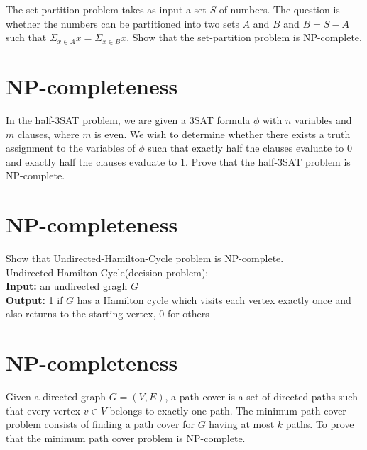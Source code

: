 \documentclass[a4paper,11pt]{article}
\begin{document}
The {\sc set-partition} problem takes as input a set $S$ of numbers. The question is whether the numbers can be partitioned into two sets $A$ and $B$ and $B = S-A$ such that $\Sigma_{x\in A} x=\Sigma_{x\in B} x$. Show that the set-partition problem is NP-complete.

\section{NP-completeness}

In the {\sc half-3SAT} problem, we are given a 3SAT formula $\phi$ with $n$ variables and $m$ clauses, where $m$ is even. We wish to determine whether there exists a truth assignment to the variables of $\phi$ such that exactly half the clauses evaluate to $0$ and exactly half the clauses evaluate to $1$. Prove that the {\sc half-3SAT} problem is NP-complete.

\section{NP-completeness}

Show that {\sc Undirected-Hamilton-Cycle} problem is NP-complete.\\
{\sc Undirected-Hamilton-Cycle(decision problem)}:\\
{\bf Input:} an undirected gragh $G$\\
{\bf Output:} 1 if $G$ has a Hamilton cycle which visits each vertex exactly once and also returns to the starting vertex, 0 for others\\

\section{NP-completeness}
Given a directed graph $G = (V, E)$, a path cover is a set of directed paths such that every vertex $v \in V$ belongs to exactly one path.
The {\sc minimum path cover} problem consists of finding a path cover for $G$ having at most $k$ paths. To prove that the {\sc minimum path cover} problem is NP-complete.
\end{document}
